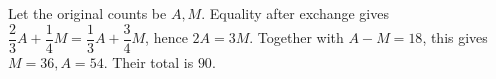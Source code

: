 Let the original counts be $ A,M $. Equality after exchange gives $\dfrac{2}{3}A+\dfrac{1}{4}M=\dfrac{1}{3}A+\dfrac{3}{4}M $, hence $ 2A=3M $. Together with $ A-M=18 $, this gives $ M=36,A=54 $. Their total is $\boxed{90}$.
